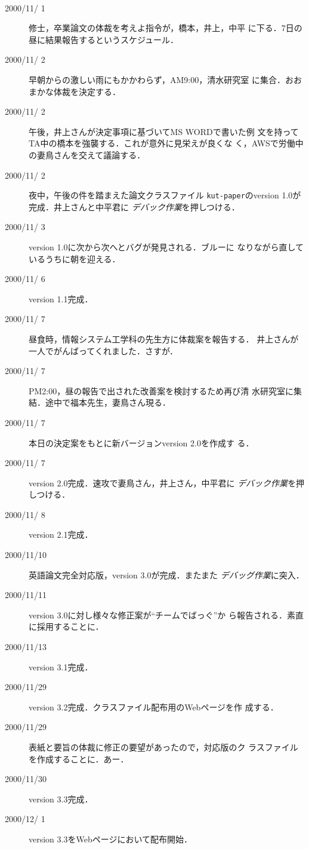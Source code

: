 \documentclass[mingoth]{kut-paper}		%
\begin{document}
\begin{description}
 \vspace{1zh}
 \item[歴史]~
 \begin{description}
  \item[2000/11/ 1] 修士，卒業論文の体裁を考えよ指令が，橋本，井上，中平
			 に下る．7日の昼に結果報告するというスケジュール．
  \item[2000/11/ 2] 早朝からの激しい雨にもかかわらず，AM9:00，清水研究室
			 に集合．おおまかな体裁を決定する．
  \item[2000/11/ 2] 午後，井上さんが決定事項に基づいてMS WORDで書いた例
			 文を持ってTA中の橋本を強襲する．これが意外に見栄えが良くな
			 く，AWSで労働中の妻鳥さんを交えて議論する．
  \item[2000/11/ 2] 夜中，午後の件を踏まえた論文クラスファイル
			 \texttt{kut-paper}のversion 1.0が完成．井上さんと中平君に
			 \emph{デバック作業}を押しつける．
  \item[2000/11/ 3] version 1.0に次から次へとバグが発見される．ブルーに
			 なりながら直しているうちに朝を迎える．
  \item[2000/11/ 6] version 1.1完成．
  \item[2000/11/ 7] 昼食時，情報システム工学科の先生方に体裁案を報告する．
			 井上さんが一人でがんばってくれました．さすが．
  \item[2000/11/ 7] PM2:00，昼の報告で出された改善案を検討するため再び清
			 水研究室に集結．途中で福本先生，妻鳥さん現る．
  \item[2000/11/ 7] 本日の決定案をもとに新バージョンversion 2.0を作成す
			 る．
  \item[2000/11/ 7] version 2.0完成．速攻で妻鳥さん，井上さん，中平君に
			 \emph{デバック作業}を押しつける．
  \item[2000/11/ 8] version 2.1完成．
  \item[2000/11/10] 英語論文完全対応版，version 3.0が完成．またまた
			 \emph{デバッグ作業}に突入．
  \item[2000/11/11] version 3.0に対し様々な修正案が``チームでばっぐ''か
			 ら報告される．素直に採用することに．
  \item[2000/11/13] version 3.1完成．
  \item[2000/11/29] version 3.2完成．クラスファイル配布用のWebページを作
			 成する．
  \item[2000/11/29] 表紙と要旨の体裁に修正の要望があったので，対応版のク
			 ラスファイルを作成することに．あー．
  \item[2000/11/30] version 3.3完成．
  \item[2000/12/ 1] version 3.3をWebページにおいて配布開始．

\end{description}
\end{description}
\end{document}
